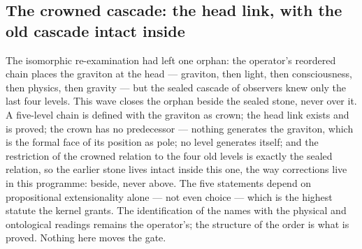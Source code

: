 \documentclass[11pt]{article}
\theoremstyle{definition}\newtheorem{deriv}{Derivation}
\begin{document}
\subsection*{The crowned cascade: the head link, with the old cascade intact inside}The isomorphic re-examination had left one orphan: the operator's reordered chain places the graviton at the head --- graviton, then light, then consciousness, then physics, then gravity --- but the sealed cascade of observers knew only the last four levels. This wave closes the orphan beside the sealed stone, never over it. A five-level chain is defined with the graviton as crown; the head link exists and is proved; the crown has no predecessor --- nothing generates the graviton, which is the formal face of its position as pole; no level generates itself; and the restriction of the crowned relation to the four old levels is exactly the sealed relation, so the earlier stone lives intact inside this one, the way corrections live in this programme: beside, never above. The five statements depend on propositional extensionality alone --- not even choice --- which is the highest statute the kernel grants. The identification of the names with the physical and ontological readings remains the operator's; the structure of the order is what is proved. Nothing here moves the gate.
\end{document}
